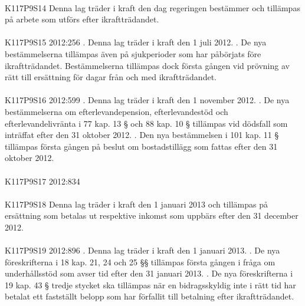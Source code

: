 \documentclass[a4paper,notitlepage,openany,10pt]{book}
\begin{document}
\paragraph*{}
{\tiny K117P9S14}
Denna lag träder i kraft den dag regeringen bestämmer och tillämpas på arbete som utförs efter ikraftträdandet.
\paragraph*{}
{\tiny K117P9S15}
2012:256
. Denna lag träder i kraft den 1 juli 2012.
. De nya bestämmelserna tillämpas även på sjukperioder som har påbörjats före ikraftträdandet. Bestämmelserna tillämpas dock första gången vid prövning av rätt till ersättning för dagar från och med ikraftträdandet.
\paragraph*{}
{\tiny K117P9S16}
2012:599
. Denna lag träder i kraft den 1 november 2012.
. De nya bestämmelserna om efterlevandepension, efterlevandestöd och efterlevandelivränta i 77 kap. 13 § och 88 kap. 10 § tillämpas vid dödsfall som inträffat efter den 31 oktober 2012.
. Den nya bestämmelsen i 101 kap. 11 § tillämpas första gången på beslut om bostadstillägg som fattas efter den 31 oktober 2012.
\paragraph*{}
{\tiny K117P9S17}
2012:834
\paragraph*{}
{\tiny K117P9S18}
Denna lag träder i kraft den 1 januari 2013 och tillämpas på ersättning som betalas ut respektive inkomst som uppbärs efter den 31 december 2012.
\paragraph*{}
{\tiny K117P9S19}
2012:896
. Denna lag träder i kraft den 1 januari 2013.
. De nya föreskrifterna i 18 kap. 21, 24 och 25 §§ tillämpas första gången i fråga om underhållsstöd som avser tid efter den 31 januari 2013.
. De nya föreskrifterna i 19 kap. 43 § tredje stycket ska tillämpas när en bidragsskyldig inte i rätt tid har betalat ett fastställt belopp som har förfallit till betalning efter ikraftträdandet.
\end{document}
